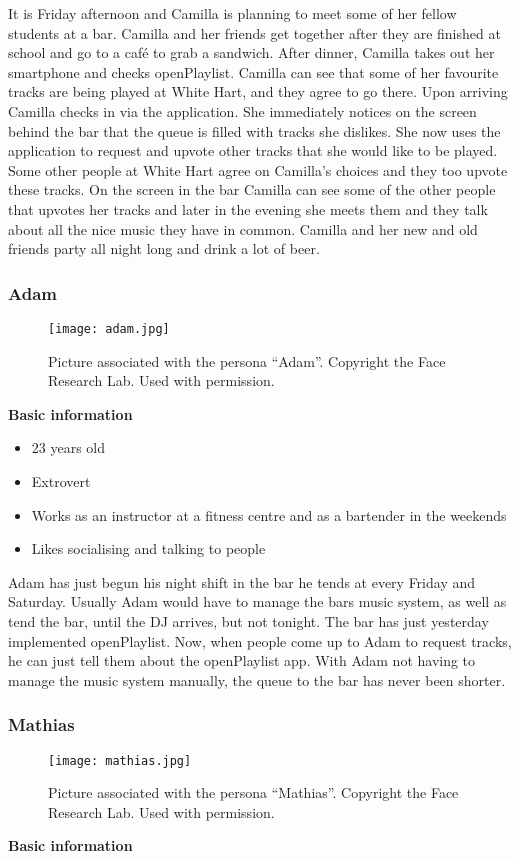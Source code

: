 It is Friday afternoon and Camilla is planning to meet some of her fellow students at a bar. Camilla and her friends get together after they are finished at school and go to a café to grab a sandwich. After dinner, Camilla takes out her smartphone and checks openPlaylist. Camilla can see that some of her favourite tracks are being played at White Hart, and they agree to go there. Upon arriving Camilla checks in via the application. She immediately notices on the screen behind the bar that the queue is filled with tracks she dislikes. She now uses the application to request and upvote other tracks that she would like to be played. Some other people at White Hart agree on Camilla's choices and they too upvote these tracks. On the screen in the bar Camilla can see some of the other people that upvotes her tracks and later in the evening she meets them and they talk about all the nice music they have in common. Camilla and her new and old friends party all night long and drink a lot of beer.

\subsubsection{Adam}
\begin{figure} [h]
  \centering
  \texttt{[image: adam.jpg]}
  \caption{Picture associated with the persona \enquote{Adam}. Copyright the Face Research Lab. Used with permission.}\label{fig:adam}
\end{figure}
\noindent\textbf{Basic information}

\begin{itemize}
\item 23 years old
\item Extrovert
\item Works as an instructor at a fitness centre and as a bartender in the weekends
\item Likes socialising and talking to people
\end{itemize}

Adam has just begun his night shift in the bar he tends at every Friday and Saturday. Usually Adam would have to manage the bars music system, as well as tend the bar, until the DJ arrives, but not tonight. The bar has just yesterday implemented openPlaylist. Now, when people come up to Adam to request tracks, he can just tell them about the openPlaylist app. With Adam not having to manage the music system manually, the queue to the bar has never been shorter.

\subsubsection{Mathias}
\begin{figure} [h]
  \centering
  \texttt{[image: mathias.jpg]}
  \caption{Picture associated with the persona \enquote{Mathias}. Copyright the Face Research Lab. Used with permission.}\label{fig:mathias}
\end{figure}
\noindent\textbf{Basic information}

